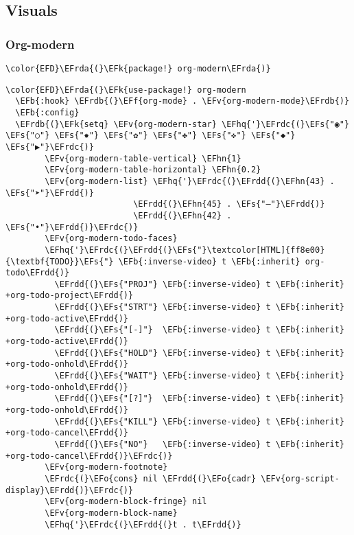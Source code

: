 \documentclass[12pt]{article}
\theoremstyle{plain}%
\theoremstyle{definition}
\theoremstyle{remark}
\newcommand{\EFs}[1]{\textcolor{EFs}{#1}} %
\newcommand{\EFk}[1]{\textcolor{EFk}{#1}} %
\newcommand{\EFb}[1]{\textcolor{EFb}{#1}} %
\newcommand{\EFf}[1]{\textcolor{EFf}{#1}} %
\newcommand{\EFv}[1]{\textcolor{EFv}{#1}} %
\newcommand{\EFo}[1]{\textcolor{EFo}{#1}} %
\newcommand{\EFhn}[1]{\textcolor{EFhn}{\textbf{#1}}} %
\newcommand{\EFhq}[1]{\textcolor{EFhq}{#1}} %
\newcommand{\EFrda}[1]{\textcolor{EFrda}{#1}} %
\newcommand{\EFrdb}[1]{\textcolor{EFrdb}{#1}} %
\newcommand{\EFrdc}[1]{\textcolor{EFrdc}{#1}} %
\newcommand{\EFrdd}[1]{\textcolor{EFrdd}{#1}} %
\begin{document}
\subsection{Visuals}
\label{sec:orgf1fd1b9}
\subsubsection{Org-modern}
\label{sec:org8b981fc}
\begin{Code}
\begin{Verbatim}
\color{EFD}\EFrda{(}\EFk{package!} org-modern\EFrda{)}
\end{Verbatim}
\end{Code}
\begin{Code}
\begin{Verbatim}
\color{EFD}\EFrda{(}\EFk{use-package!} org-modern
  \EFb{:hook} \EFrdb{(}\EFf{org-mode} . \EFv{org-modern-mode}\EFrdb{)}
  \EFb{:config}
  \EFrdb{(}\EFk{setq} \EFv{org-modern-star} \EFhq{'}\EFrdc{(}\EFs{"◉"} \EFs{"○"} \EFs{"✸"} \EFs{"✿"} \EFs{"✤"} \EFs{"✜"} \EFs{"◆"} \EFs{"▶"}\EFrdc{)}
        \EFv{org-modern-table-vertical} \EFhn{1}
        \EFv{org-modern-table-horizontal} \EFhn{0.2}
        \EFv{org-modern-list} \EFhq{'}\EFrdc{(}\EFrdd{(}\EFhn{43} . \EFs{"➤"}\EFrdd{)}
                          \EFrdd{(}\EFhn{45} . \EFs{"–"}\EFrdd{)}
                          \EFrdd{(}\EFhn{42} . \EFs{"•"}\EFrdd{)}\EFrdc{)}
        \EFv{org-modern-todo-faces}
        \EFhq{'}\EFrdc{(}\EFrdd{(}\EFs{"}\textcolor[HTML]{ff8e00}{\textbf{TODO}}\EFs{"} \EFb{:inverse-video} t \EFb{:inherit} org-todo\EFrdd{)}
          \EFrdd{(}\EFs{"PROJ"} \EFb{:inverse-video} t \EFb{:inherit} +org-todo-project\EFrdd{)}
          \EFrdd{(}\EFs{"STRT"} \EFb{:inverse-video} t \EFb{:inherit} +org-todo-active\EFrdd{)}
          \EFrdd{(}\EFs{"[-]"}  \EFb{:inverse-video} t \EFb{:inherit} +org-todo-active\EFrdd{)}
          \EFrdd{(}\EFs{"HOLD"} \EFb{:inverse-video} t \EFb{:inherit} +org-todo-onhold\EFrdd{)}
          \EFrdd{(}\EFs{"WAIT"} \EFb{:inverse-video} t \EFb{:inherit} +org-todo-onhold\EFrdd{)}
          \EFrdd{(}\EFs{"[?]"}  \EFb{:inverse-video} t \EFb{:inherit} +org-todo-onhold\EFrdd{)}
          \EFrdd{(}\EFs{"KILL"} \EFb{:inverse-video} t \EFb{:inherit} +org-todo-cancel\EFrdd{)}
          \EFrdd{(}\EFs{"NO"}   \EFb{:inverse-video} t \EFb{:inherit} +org-todo-cancel\EFrdd{)}\EFrdc{)}
        \EFv{org-modern-footnote}
        \EFrdc{(}\EFo{cons} nil \EFrdd{(}\EFo{cadr} \EFv{org-script-display}\EFrdd{)}\EFrdc{)}
        \EFv{org-modern-block-fringe} nil
        \EFv{org-modern-block-name}
        \EFhq{'}\EFrdc{(}\EFrdd{(}t . t\EFrdd{)}

\end{Verbatim}
\end{Code}
\end{document}
